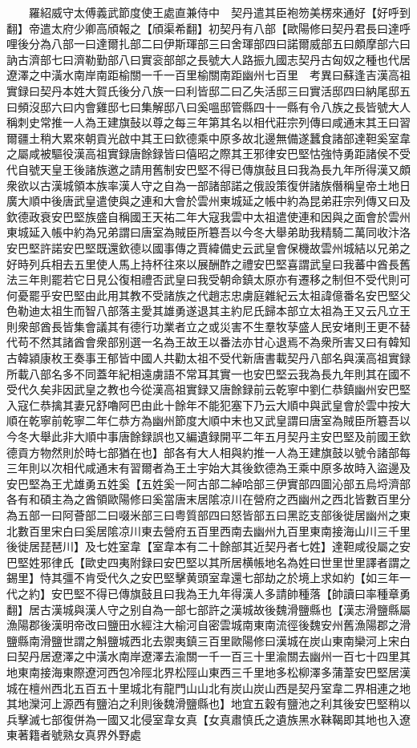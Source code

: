 　　羅紹威守太傅義武節度使王處直兼侍中　契丹遣其臣袍笏美楞來通好【好呼到翻】帝遣太府少卿高頎報之【頎渠希翻】初契丹有八部【歐陽修曰契丹君長曰達呼哩後分為八部一曰達爾扎部二曰伊斯琿部三曰舍琿部四曰諾爾威部五曰頗摩部六曰訥古濟部七曰濟勒勤部八曰實衮部部之長號大人路振九國志契丹古匈奴之種也代居遼澤之中潢水南岸南距榆關一千一百里榆關南距幽州七百里　考異曰蘇逢吉漢高祖實録曰契丹本姓大賀氏後分八族一曰利皆邸二曰乙失活邸三曰實活邸四曰納尾邸五曰頻沒邸六曰内會雞邸七曰集解邸八曰奚嗢邸管縣四十一縣有令八族之長皆號大人稱刺史常推一人為王建旗鼔以尊之每三年第其名以相代莊宗列傳曰咸通末其王曰習爾疆土稍大累來朝貢光啟中其王曰欽德乘中原多故北邊無備遂蠶食諸部達靼奚室韋之屬咸被驅役漢高祖實録唐餘録皆曰僖昭之際其王邪律安巴堅怙強恃勇距諸侯不受代自號天皇王後諸族邀之請用舊制安巴堅不得已傳旗鼔且曰我為長九年所得漢又頗衆欲以古漢城領本族率漢人守之自為一部諸部諾之俄設策復併諸族僭稱皇帝土地日廣大順中後唐武皇遣使與之連和大會於雲州東城延之帳中約為昆弟莊宗列傳又曰及欽德政衰安巴堅族盛自稱國王天祐二年大寇我雲中太祖遣使連和因與之面會於雲州東城延入帳中約為兄弟謂曰唐室為賊臣所簒吾以今冬大舉弟助我精騎二萬同收汴洛安巴堅許諾安巴堅既還欽德以國事傳之賈緯備史云武皇會保機故雲州城結以兄弟之好時列兵相去五里使人馬上持杯往來以展酬酢之禮安巴堅喜謂武皇曰我蕃中酋長舊法三年則罷若它日見公復相禮否武皇曰我受朝命鎮太原亦有遷移之制但不受代則可何憂罷乎安巴堅由此用其教不受諸族之代趙志忠虜庭雜紀云太祖諱億番名安巴堅父色勒迪太祖生而智八部落主愛其雄勇遂退其主約尼氏歸本部立太祖為王又云凡立王則衆部酋長皆集會議其有德行功業者立之或災害不生羣牧孶盛人民安堵則王更不替代苟不然其諸酋會衆部别選一名為王故王以番法亦甘心退焉不為衆所害又曰有韓知古韓潁康枚王奏事王郁皆中國人共勸太祖不受代新唐書載契丹八部名與漢高祖實録所載八部名多不同蓋年紀相遠虜語不常耳其實一也安巴堅云我為長九年則其在國不受代久矣非因武皇之教也今從漢高祖實録又唐餘録前云乾寧中劉仁恭鎮幽州安巴堅入寇仁恭擒其妻兄舒嚕阿巴由此十餘年不能犯塞下乃云大順中與武皇會於雲中按大順在乾寧前乾寧二年仁恭方為幽州節度大順中末也又武皇謂曰唐室為賊臣所簒吾以今冬大舉此非大順中事唐餘録誤也又編遺録開平二年五月契丹主安巴堅及前國王欽德貢方物然則於時七部猶在也】部各有大人相與約推一人為王建旗鼓以號令諸部每三年則以次相代咸通末有習爾者為王土宇始大其後欽德為王乘中原多故時入盜邊及安巴堅為王尤雄勇五姓奚【五姓奚一阿古部二綽哈部三伊實部四圖沁部五烏埒濟部各有和碩主為之酋領歐陽修曰奚當唐末居隂凉川在營府之西幽州之西北皆數百里分為五部一曰阿薈部二曰啜米部三曰粤質部四曰怒皆部五曰黑訖支部後徙居幽州之東北數百里宋白曰奚居隂凉川東去營府五百里西南去幽州九百里東南接海山川三千里後徙居琵琶川】及七姓室韋【室韋本有二十餘部其近契丹者七姓】達靼咸役屬之安巴堅姓邪律氏【歐史四夷附録曰安巴堅以其所居横帳地名為姓曰世里世里譯者謂之錫里】恃其彊不肯受代久之安巴堅擊黄頭室韋還七部劫之於境上求如約【如三年一代之約】安巴堅不得已傳旗鼓且曰我為王九年得漢人多請帥種落【帥讀曰率種章勇翻】居古漢城與漢人守之别自為一部七部許之漢城故後魏滑鹽縣也【漢志滑鹽縣屬漁陽郡後漢明帝改曰鹽田水經注大榆河自密雲城南東南流徑後魏安州舊漁陽郡之滑鹽縣南滑鹽世謂之斛鹽城西北去禦夷鎮三百里歐陽修曰漢城在炭山東南欒河上宋白曰契丹居遼澤之中潢水南岸遼澤去渝關一千一百三十里渝關去幽州一百七十四里其地東南接海東際遼河西包冷陘北界松陘山東西三千里地多松柳澤多蒲葦安巴堅居漢城在檀州西北五百五十里城北有龍門山山北有炭山炭山西是契丹室韋二界相連之地其地灤河上源西有鹽泊之利則後魏滑鹽縣也】地宜五穀有鹽池之利其後安巴堅稍以兵擊滅七部復併為一國又北侵室韋女真【女真肅慎氏之遺族黑水靺鞨即其地也入遼東著籍者號熟女真界外野處
